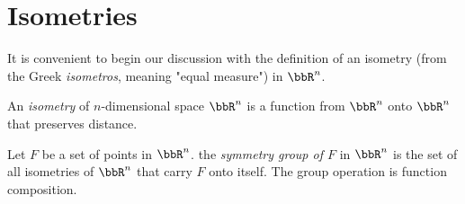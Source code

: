 \section{Isometries}

\begin{remark}
	It is convenient to begin our discussion with the definition of an isometry (from the Greek \textit{isometros}, meaning "equal measure") in $\bbR^n$.
\end{remark}

\begin{definition}[Isometry]
	An \textit{isometry} of $n$-dimensional space $\bbR^n$ is a function from $\bbR^n$ onto $\bbR^n$ that preserves distance.
\end{definition}

\begin{definition}
	Let $F$ be a set of points in $\bbR^n$. the \textit{symmetry group of $F$} in $\bbR^n$ is the set of all isometries of $\bbR^n$ that carry $F$ onto itself. The group operation is function composition.
\end{definition}

